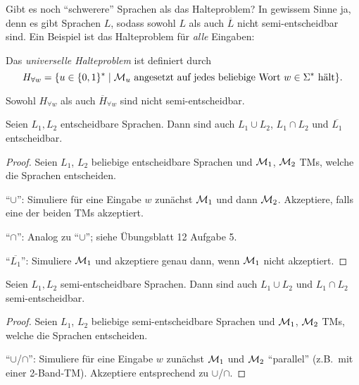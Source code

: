 \begin{Bemerkung}
	Gibt es noch "`schwerere"' Sprachen als das Halteproblem?
	In gewissem Sinne ja, denn es gibt Sprachen $L$, sodass sowohl $L$ als auch $\overline{L}$ nicht semi-entscheidbar sind.
	Ein Beispiel ist das Halteproblem für \emph{alle} Eingaben:
\end{Bemerkung}


\begin{Def}[name={[Universelles Halteproblem $H_{\forall w}$]}]
	Das \emph{universelle Halteproblem} ist definiert durch
	$$
	H_{\forall w} = \{u\in\{0,1\}^* \mid \text{$\mathcal{M}_u$ angesetzt auf jedes beliebige Wort $w \in \Sigma^*$ hält}\}. \qedhere
	$$
\end{Def}

\begin{Satz}[name={[Universelles Halteproblem $H_{\forall w}$]}]
	Sowohl $H_{\forall w}$ als auch $\overline{H}_{\forall w}$ sind nicht semi-entscheidbar.
\end{Satz}

\begin{Satz}
	Seien $L_1, L_2$ entscheidbare Sprachen.
	Dann sind auch $L_1 \cup L_2$, $L_1 \cap L_2$ und $\overline{L_1}$ entscheidbar.
\end{Satz}


\begin{proof}
	Seien $L_1$, $L_2$ beliebige entscheidbare Sprachen und $\mathcal{M}_1$, $\mathcal{M}_2$ \ac{TM}s, welche die Sprachen entscheiden.

	"`$\cup$"': Simuliere für eine Eingabe $w$ zunächst $\mathcal{M}_1$ und dann $\mathcal{M}_2$.
	Akzeptiere, falls eine der beiden \ac{TM}s akzeptiert.

	"`$\cap$"': Analog zu "`$\cup$"'; siehe Übungsblatt 12 Aufgabe 5.

	"`$\overline{L_1}$"': Simuliere $\mathcal{M}_1$ und akzeptiere genau dann, wenn $\mathcal{M}_1$ nicht akzeptiert.
\end{proof}

\begin{Satz}\label{satz:SemidetCupCap}
	Seien $L_1, L_2$ semi-entscheidbare Sprachen.
	Dann sind auch $L_1 \cup L_2$ und $L_1 \cap L_2$ semi-entscheidbar.
\end{Satz}

\begin{proof}
	Seien $L_1$, $L_2$ beliebige semi-entscheidbare Sprachen und $\mathcal{M}_1$, $\mathcal{M}_2$ \ac{TM}s, welche die Sprachen entscheiden.

	"`$\cup$/$\cap$"': Simuliere für eine Eingabe $w$ zunächst $\mathcal{M}_1$ und $\mathcal{M}_2$ "`parallel"' (z.B.\ mit einer 2-Band-\ac{TM}).
	Akzeptiere entsprechend zu $\cup$/$\cap$.
\end{proof}

